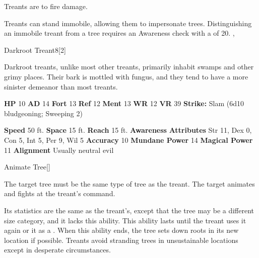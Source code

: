         Treants are  to fire damage.
      
        Treants can stand immobile, allowing them to impersonate trees.
        Distinguishing an immobile treant from a tree requires an Awareness check with a  of 20.
  ,
  \begin{monsubsection}{Darkroot Treant}{8}[2]
    \vspace{-1em}\vspace{-1em}
    \vspace{0em}

    
        Darkroot treants, unlike most other treants, primarily inhabit swamps and other grimy places.
        Their bark is mottled with fungus, and they tend to have a more sinister demeanor than most treants.
      
    

    \begin{spellcontent}
      \begin{spelltargetinginfo}
        \pari \textbf{HP} 10 \monsep
          \textbf{AD} 14 \monsep
          \textbf{Fort} 13 \monsep
          \textbf{Ref} 12 \monsep
          \textbf{Ment} 13
        \pari \textbf{WR} 12 \monsep
        \textbf{VR} 39
        \pari \textbf{Strike:}
            Slam  (6d10 bludgeoning; Sweeping 2)
      \end{spelltargetinginfo}
    \end{spellcontent}
    \begin{monsterfooter}
      \pari \textbf{Speed} 50 ft. \monsep
        \textbf{Space} 15 ft. \monsep
        \textbf{Reach} 15 ft.
      \pari \textbf{Awareness} 
      \pari \textbf{Attributes}
        Str 11, Dex 0,
        Con 5, Int 5,
        Per 9, Wil 5
      \pari \textbf{Accuracy} 10 \monsep
        \textbf{Mundane Power} 14 \monsep
      \textbf{Magical Power} 11
      \pari \textbf{Alignment} Usually neutral evil
    \end{monsterfooter}
  \end{monsubsection}
  \begin{freeability}{Animate Tree}[]
      
        The target tree must be the same type of tree as the treant.
        The target animates and fights at the treant's command.

        Its statistics are the same as the treant's, except that the tree may be a different size category, and it lacks this ability.
        This ability lasts until the treant uses it again or  it as a .
        When this ability ends, the tree sets down roots in its new location if possible.
        Treants avoid stranding trees in unsustainable locations except in desperate circumstances.
      
    \end{freeability}
  

